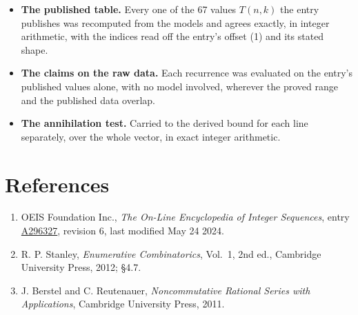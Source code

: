\documentclass[11pt]{article}
\theoremstyle{definition}
\begin{document}
\begin{itemize}

\item {\bfseries The published table.} Every one of the 67 values $T(n,k)$ the entry publishes was recomputed from the models and agrees exactly, in integer arithmetic, with the indices read off the entry's offset (1) and its stated shape.

\item {\bfseries The claims on the raw data.} Each recurrence was evaluated on the entry's published values alone, with no model involved, wherever the proved range and the published data overlap.

\item {\bfseries The annihilation test.} Carried to the derived bound for each line separately, over the whole vector, in exact integer arithmetic.

\end{itemize}

\section{References}

\begin{enumerate}

\item OEIS Foundation Inc., \emph{The On-Line Encyclopedia of Integer Sequences}, entry \href{https://oeis.org/A296327}{A296327}, revision 6, last modified May 24 2024.

\item R. P. Stanley, \emph{Enumerative Combinatorics}, Vol.~1, 2nd ed., Cambridge University Press, 2012; \S4.7.

\item J. Berstel and C. Reutenauer, \emph{Noncommutative Rational Series with Applications}, Cambridge University Press, 2011.

\end{enumerate}
\end{document}
